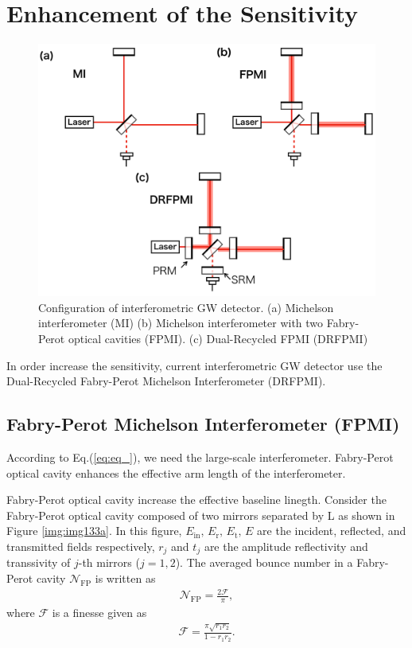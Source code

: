\section{Enhancement of the Sensitivity} \label{sec:13}
\begin{figure}[h]
  \begin{center}   
    \includegraphics[width=14cm]{./img_chap1/img133.png}
    \caption{Configuration of interferometric GW detector. (a) Michelson interferometer (MI) (b) Michelson interferometer with two Fabry-Perot optical cavities (FPMI). (c) Dual-Recycled FPMI (DRFPMI)} \label{img:img133}
  \end{center}
\end{figure}
In order increase the sensitivity, current interferometric GW detector use the Dual-Recycled Fabry-Perot Michelson Interferometer (DRFPMI). 


\subsection{Fabry-Perot Michelson Interferometer (FPMI)}
According to Eq.(\ref{eq:eq_}), we need the large-scale interferometer. Fabry-Perot optical cavity enhances the effective arm length of the interferometer.

Fabry-Perot optical cavity increase the effective baseline linegth. Consider the Fabry-Perot optical cavity composed of two mirrors separated by L as shown in Figure \ref{img:img133a}. In this figure, $E_{\mathrm{in}},\,E_{\mathrm{r}},\,E_{\mathrm{t}},\,E$ are the incident, reflected, and transmitted fields respectively, $r_{j}$ and $t_{j}$ are the amplitude reflectivity and transsivity of $j$-th mirrors ($j=1,2$). The averaged bounce number in a Fabry-Perot cavity $\mathcal{N}_{\mathrm{FP}}$ is written as \cite{ando1999power}
\begin{eqnarray}
  \mathcal{N}_{\mathrm{FP}} = \frac{2\mathcal{F}}{\pi},
\end{eqnarray}
where $\mathcal{F}$ is a finesse given as
\begin{eqnarray}
  \mathcal{F}=\frac{\pi \sqrt{r_{1} r_{2}}}{1-r_{1} r_{2}}.
\end{eqnarray}


